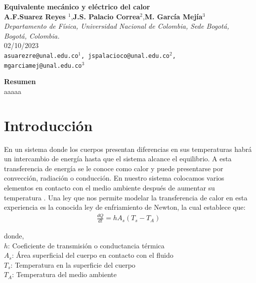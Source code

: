\documentclass{article}
\date{}
\begin{document}
 
     \begin{center}
        {\Large \textbf{Equivalente mecánico y eléctrico del calor}}\\
        \vspace{5mm}
        {\small \textbf{A.F.Suarez Reyes $^{1}$},\textbf{J.S. Palacio Correa$^{2}$},\textbf{M. García Mejía$^{3}$} \\
        \vspace{3mm}}
        {\small \textit{Departamento de Física, Universidad Nacional de Colombia, Sede Bogotá, Bogotá, Colombia.}}\\
        \vspace{3mm}
        {\small 02/10/2023}\\
        \vspace{3mm}
        {\texttt{\textup{asuarezre@unal.edu.co$^{1}$, jspalacioco@unal.edu.co$^2$, mgarciamej@unal.edu.co$^{3}$}}} \\
    \end{center}
    
    
    \vspace{5mm}

{\large \textbf{Resumen}}\\
aaaaa

\textit{ \hspace{2mm}}

\section{Introducción}
En un sistema donde los cuerpos presentan diferencias en sus temperaturas habrá un intercambio de energía hasta que el sistema alcance el equilibrio. A esta transferencia de energía  se le conoce como calor y puede presentarse por convección, radiación o conducción. 
En nuestro sistema colocamos varios elementos en contacto con el medio ambiente después de aumentar su temperatura . Una ley que nos permite modelar la transferencia de calor en esta experiencia es la conocida ley de enfriamiento de Newton, la cual establece que: 
\begin{align}
    \frac{dQ}{dt} = hA_s(T_s-T_A) 
\end{align}

donde,  \\ 
$h$:  Coeficiente de transmisión o conductancia térmica  \\ 
$A_s$: Área superficial del cuerpo en contacto con el fluido \\ 
$T_s$: Temperatura en la superficie del cuerpo \\ 
$T_A$: Temperatura del medio ambiente
\end{document}
